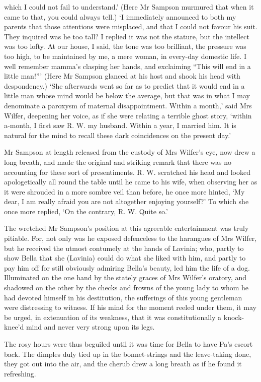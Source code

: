 which I could not fail to understand.’ (Here Mr Sampson murmured that
when it came to that, you could always tell.) ‘I immediately announced
to both my parents that those attentions were misplaced, and that I
could not favour his suit. They inquired was he too tall? I replied it
was not the stature, but the intellect was too lofty. At our house,
I said, the tone was too brilliant, the pressure was too high, to be
maintained by me, a mere woman, in every-day domestic life. I well
remember mamma’s clasping her hands, and exclaiming “This will end in
a little man!”’ (Here Mr Sampson glanced at his host and shook his head
with despondency.) ‘She afterwards went so far as to predict that it
would end in a little man whose mind would be below the average, but
that was in what I may denominate a paroxysm of maternal disappointment.
Within a month,’ said Mrs Wilfer, deepening her voice, as if she were
relating a terrible ghost story, ‘within a-month, I first saw R. W. my
husband. Within a year, I married him. It is natural for the mind to
recall these dark coincidences on the present day.’

Mr Sampson at length released from the custody of Mrs Wilfer’s eye, now
drew a long breath, and made the original and striking remark that there
was no accounting for these sort of presentiments. R. W. scratched his
head and looked apologetically all round the table until he came to his
wife, when observing her as it were shrouded in a more sombre veil than
before, he once more hinted, ‘My dear, I am really afraid you are not
altogether enjoying yourself?’ To which she once more replied, ‘On the
contrary, R. W. Quite so.’

The wretched Mr Sampson’s position at this agreeable entertainment
was truly pitiable. For, not only was he exposed defenceless to the
harangues of Mrs Wilfer, but he received the utmost contumely at the
hands of Lavinia; who, partly to show Bella that she (Lavinia) could do
what she liked with him, and partly to pay him off for still obviously
admiring Bella’s beauty, led him the life of a dog. Illuminated on the
one hand by the stately graces of Mrs Wilfer’s oratory, and shadowed
on the other by the checks and frowns of the young lady to whom he
had devoted himself in his destitution, the sufferings of this young
gentleman were distressing to witness. If his mind for the moment reeled
under them, it may be urged, in extenuation of its weakness, that it
was constitutionally a knock-knee’d mind and never very strong upon its
legs.

The rosy hours were thus beguiled until it was time for Bella to have
Pa’s escort back. The dimples duly tied up in the bonnet-strings and the
leave-taking done, they got out into the air, and the cherub drew a long
breath as if he found it refreshing.

